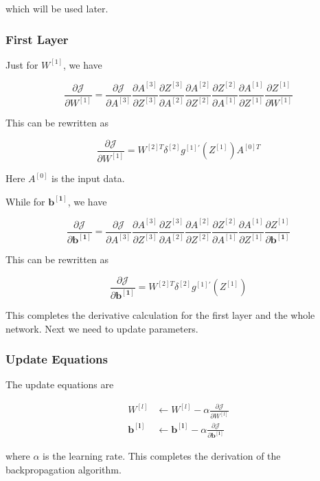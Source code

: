 \documentclass[12pt]{article}
\begin{document}
which will be used later.

\subsubsection{First Layer}
Just for $W^{[1]}$, we have

$$
    \frac{\partial{\mathcal{J}}}{\partial W^{[1]}} = \frac{\partial{\mathcal{J}}}{\partial A^{[3]}} \frac{\partial A^{[3]}}{\partial Z^{[3]}} \frac{\partial Z^{[3]}}{\partial A^{[2]}} \frac{\partial A^{[2]}}{\partial Z^{[2]}} \frac{\partial Z^{[2]}}{\partial A^{[1]}} \frac{\partial A^{[1]}}{\partial Z^{[1]}} \frac{\partial Z^{[1]}}{\partial W^{[1]}}
$$

This can be rewritten as

$$
    \frac{\partial{\mathcal{J}}}{\partial W^{[1]}} =  W^{[2] T} \delta^{[2]} g^{[1]'}(Z^{[1]}) A^{[0] T}
$$

Here $A^{[0]}$ is the input data.

While for $\mathbf{b^{[1]}}$, we have

$$
    \frac{\partial{\mathcal{J}}}{\partial \mathbf{b^{[1]}}} = \frac{\partial{\mathcal{J}}}{\partial A^{[3]}} \frac{\partial A^{[3]}}{\partial Z^{[3]}} \frac{\partial Z^{[3]}}{\partial A^{[2]}} \frac{\partial A^{[2]}}{\partial Z^{[2]}} \frac{\partial Z^{[2]}}{\partial A^{[1]}} \frac{\partial A^{[1]}}{\partial Z^{[1]}} \frac{\partial Z^{[1]}}{\partial \mathbf{b^{[1]}}}
$$

This can be rewritten as

$$
    \frac{\partial{\mathcal{J}}}{\partial \mathbf{b^{[1]}}} =  W^{[2] T} \delta^{[2]} g^{[1]'}(Z^{[1]})
$$

This completes the derivative calculation for the first layer and the whole network. Next we need to update parameters.
\subsubsection{Update Equations}
The update equations are

$$
    \begin{aligned}
        W^{[l]}          & \leftarrow W^{[l]} - \alpha \frac{\partial{\mathcal{J}}}{\partial W^{[l]}}                   \\
        \mathbf{b^{[l]}} & \leftarrow \mathbf{b^{[l]}} - \alpha \frac{\partial{\mathcal{J}}}{\partial \mathbf{b^{[l]}}}
    \end{aligned}
$$

where $\alpha$ is the learning rate. This completes the derivation of the backpropagation algorithm.
\end{document}
